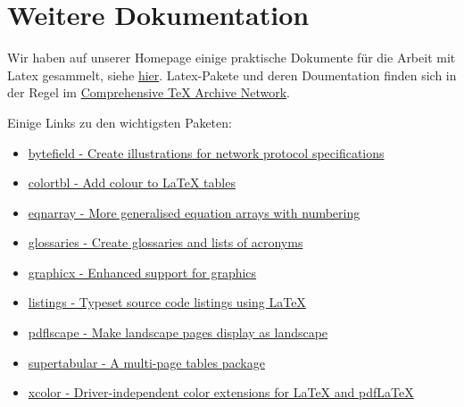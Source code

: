 \newpage
\section{Weitere Dokumentation}
Wir haben auf unserer Homepage einige praktische Dokumente für die Arbeit mit Latex gesammelt, siehe \href{http://www.uni-muenster.de/Comsys/en/teaching/technical_writing.html}{hier}.
Latex-Pakete und deren Doumentation finden sich in der Regel im \href{http://www.ctan.org/}{Comprehensive TeX Archive Network}.

Einige Links zu den wichtigsten Paketen:
\begin{itemize}
	\item \href{http://tug.ctan.org/cgi-bin/ctanPackageInformation.py?id=bytefield}{bytefield - Create illustrations for network protocol specifications}
	\item \href{http://tug.ctan.org/cgi-bin/ctanPackageInformation.py?id=colortbl}{colortbl - Add colour to LaTeX tables}
	\item \href{http://tug.ctan.org/cgi-bin/ctanPackageInformation.py?id=eqnarray}{eqnarray - More generalised equation arrays with numbering}
	\item \href{http://tug.ctan.org/cgi-bin/ctanPackageInformation.py?id=glossaries}{glossaries - Create glossaries and lists of acronyms}
	\item \href{http://tug.ctan.org/cgi-bin/ctanPackageInformation.py?id=graphicx}{graphicx - Enhanced support for graphics}
	\item \href{http://tug.ctan.org/cgi-bin/ctanPackageInformation.py?id=listings}{listings - Typeset source code listings using LaTeX}
	\item \href{http://tug.ctan.org/cgi-bin/ctanPackageInformation.py?id=pdflscape}{pdflscape - Make landscape pages display as landscape}
	\item \href{http://tug.ctan.org/cgi-bin/ctanPackageInformation.py?id=supertabular}{supertabular - A multi-page tables package}
	\item \href{http://tug.ctan.org/cgi-bin/ctanPackageInformation.py?id=xcolor}{xcolor - Driver-independent color extensions for LaTeX and pdfLaTeX}
\end{itemize}
